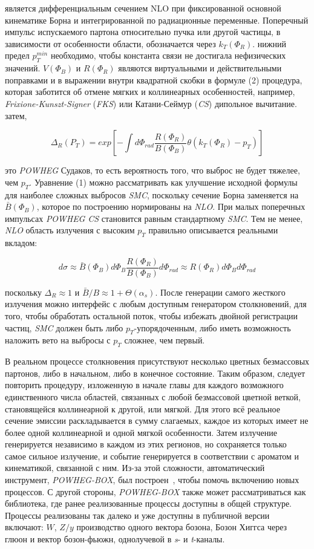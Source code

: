 является дифференциальным сечением NLO при фиксированной основной кинематике Борна и интегрированной по
радиационные переменные. Поперечный импульс испускаемого партона относительно
пучка или другой частицы, в зависимости от особенности области, обозначается через ${k}_{T}({\Phi}_{R})$.
нижний предел ${p}_{T}^{min}$
необходимо, чтобы константа связи не достигала нефизических значений.
$V({\Phi}_{B})$ и $R({\Phi}_{R})$ являются виртуальными и действительными поправками и в выражении внутри
квадратной скобки в формуле (2) процедура, которая заботится об отмене мягких и коллинеарных
особенностей, например, \textit{Frixione-Kunszt-Signer} (\textit{FKS}) или Катани-Сеймур (\textit{CS})
дипольное вычитание. затем,

\[ 
	{\Delta}_{R}({P}_{T}) = exp[-\int d{\Phi}_{rad}\frac{R({\Phi}_{R})}{B({\Phi}_{B})}\theta({k}_{T}({\Phi}_{R}) - {p}_{T})]
\]

это \textit{POWHEG} Судаков, то есть вероятность того, что выброс не будет тяжелее, чем ${p}_{T}$. Уравнение (1) можно рассматривать как улучшение исходной формулы для наиболее сложных выбросов \textit{SMC}, поскольку
сечение Борна заменяется на $\bar{B}({\Phi}_{B})$, которое по построению нормированы на \textit{NLO}.
При малых поперечных импульсах \textit{POWHEG} \textit{CS} становится равным стандартному \textit{SMC}.
Тем не менее, \textit{NLO}
область излучения с высоким ${p}_{T}$ правильно описывается реальными вкладом:

\[ 
	d\sigma \approx \bar{B}({\Phi}_{B}) d{\Phi}_{B}\frac{R({\Phi}_{R})}{B({\Phi}_{B})}d{\Phi}_{rad}\approx R({\Phi}_{R})d{\Phi}_{B}d{\Phi}_{rad}
\]


поскольку ${\Delta}_{R} \approx 1$ и $\bar{B}/B \approx 1 + \Theta ({\alpha}_{s})$. После генерации самого жесткого излучения можно
интерфейс с любым доступным генератором столкновений, для того, чтобы обработать остальной поток,
чтобы избежать двойной регистрации частиц, \textit{SMC} должен быть либо ${p}_{T}$-упорядоченным, либо иметь возможность
наложить вето на выбросы с ${p}_{T}$ сложнее, чем первый.

В реальном процессе столкновения присутствуют несколько цветных безмассовых партонов, либо в начальном, либо в
конечное состояние. Таким образом, следует повторить процедуру, изложенную в начале главы для каждого возможного единственного числа
областей, связанных с любой безмассовой цветной веткой, становящейся коллинеарной к другой, или мягкой.
Для этого всё реальное сечение эмиссии раскладывается в сумму слагаемых, каждое
из которых имеет не более одной коллинеарной и одной мягкой особенности. Затем излучение генерируется
независимо в каждом из этих регионов, но сохраняется только самое сильное излучение, и событие
генерируется в соответствии с ароматом и кинематикой, связанной с ним. Из-за этой сложности,
автоматический инструмент, \textit{POWHEG-BOX}, был построен~\cite{review-powheg}, чтобы помочь включению новых
процессов. С другой стороны, \textit{POWHEG-BOX} также может рассматриваться как библиотека, где ранее
реализованные процессы доступны в общей структуре. Процессы реализованы так
далеко и уже доступны в публичной версии включают: $W$, $Z / y$ производство одного вектора бозона,
Бозон Хиггса через глюон и вектор бозон-фьюжн, однолучевой в \textit{s}- и \textit{t}-каналы.

